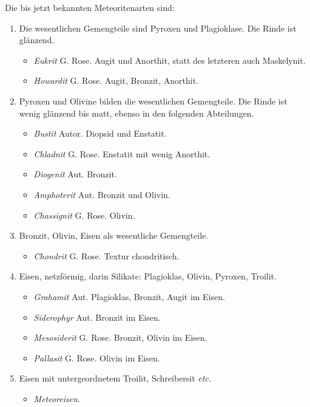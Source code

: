 \documentclass[a4paper, 12pt, oneside]{article}
\begin{document}
Die bis jetzt bekannten Meteoritenarten sind:
\begin{enumerate}
    \item Die wesentlichen Gemengteile sind Pyroxen und Plagioklase. Die Rinde ist glänzend.
    \begin{itemize}
        \item \emph{Eukrit} G. Rose. Augit und Anorthit, statt des letzteren auch Maskelynit.
        \item \emph{Howardit} G. Rose. Augit, Bronzit, Anorthit.
    \end{itemize}
    \item Pyroxen und Olivine bilden die wesentlichen Gemengteile. Die Rinde ist wenig glänzend bis matt, ebenso in den folgenden Abteilungen.
    \begin{itemize}
        \item \emph{Bustit} Autor. Diopsid und Enstatit.
        \item \emph{Chladnit} G. Rose. Enstatit mit wenig Anorthit.
        \item \emph{Diogenit} Aut. Bronzit.
        \item \emph{Amphoterit} Aut. Bronzit und Olivin.        
        \item \emph{Chassignit} G. Rose. Olivin.
    \end{itemize}
    \item Bronzit, Olivin, Eisen als wesentliche Gemengteile.
    \begin{itemize}
        \item \emph{Chondrit} G. Rose. Textur chondritisch.
    \end{itemize}
    \item Eisen, netzförmig, darin Silikate: Plagioklas, Olivin, Pyroxen, Troilit.
    \begin{itemize}
        \item \emph{Grahamit} Aut. Plagioklas, Bronzit, Augit im Eisen.
        \item \emph{Siderophyr} Aut. Bronzit im Eisen.
        \item \emph{Mesosiderit} G. Rose. Bronzit, Olivin im Eisen.
        \item \emph{Pallasit} G. Rose. Olivin im Eisen.
    \end{itemize}
    \item Eisen mit untergeordnetem Troilit, Schreibersit \emph{etc.}
    \begin{itemize}
        \item \emph{Meteoreisen}.
    \end{itemize}
\end{enumerate}
\end{document}
